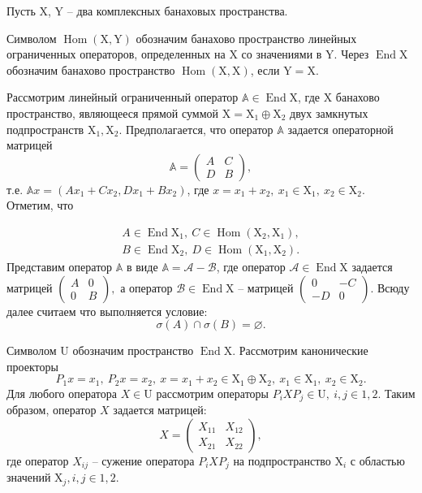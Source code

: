Пусть $\mathrm{X}$, $\mathrm{Y}$ -- два комплексных банаховых пространства.

Символом $\operatorname{Hom}(\mathrm{X}, \mathrm{Y})$ обозначим банахово пространство линейных ограниченных операторов, определенных на $\mathrm{X}$ со значениями в $\mathrm{Y}$. Через $\operatorname{End}\mathrm{X}$ обозначим банахово пространство $\operatorname{Hom}(\mathrm{X}, \mathrm{X})$, 
если $\mathrm{Y} = \mathrm{X}$.

Рассмотрим линейный ограниченный оператор $\mathbb{A} \in \operatorname{End}\mathrm{X}$,
где $\mathrm{X}$ банахово пространство, являющееся прямой суммой 
$\mathrm{X} = \mathrm{X}_1 \oplus \mathrm{X}_2$ двух замкнутых подпространств
$\mathrm{X}_1, \mathrm{X}_2$. Предполагается, что оператор $\mathbb{A}$ задается операторной матрицей
$$
\mathbb{A} = \begin{pmatrix}
		A & C \\
		D & B
	\end{pmatrix},
$$
т.е. $\mathbb{A}x = (A x_1 + C x_2, D x_1 + B x_2)$, где $x = x_1 + x_2, \ x_1 \in \mathrm{X}_1, \ x_2 \in \mathrm{X}_2$. Отметим, что

\begin{align*}
A \in \operatorname{End}\mathrm{X}_1, \ C \in \operatorname{Hom}(\mathrm{X}_2, \mathrm{X}_1), \\
B \in \operatorname{End}\mathrm{X}_2, \ D \in \operatorname{Hom}(\mathrm{X}_1, \mathrm{X}_2).
\end{align*}
Представим оператор $\mathbb{A}$ в виде $\mathbb{A} = \mathcal{A} - \mathcal{B}$, где оператор 
$\mathcal{A} \in \operatorname{End}\mathrm{X}$ задается матрицей 
$\begin{pmatrix}
		A & 0 \\
		0 & B
\end{pmatrix}, $ а оператор $\mathcal{B} \in \operatorname{End}\mathrm{X}$ -- матрицей
$\begin{pmatrix}
		0 & -C \\
		-D & 0
\end{pmatrix}.$
Всюду далее считаем что выполняется условие:
$$
\sigma(A) \cap \sigma(B) = {\varnothing}.
$$

Символом $\mathrm{U}$ обозначим пространство $\operatorname{End}\mathrm{X}$. Рассмотрим канонические проекторы
$$
P_1x = x_1, \ P_2x = x_2, \ x = x_1 + x_2 \in \mathrm{X}_1 \oplus \mathrm{X}_2, 
\ x_1 \in \mathrm{X}_1, \ x_2 \in \mathrm{X}_2.
$$
Для любого оператора $X \in \mathrm{U}$ рассмотрим операторы $P_i X P_j \in \mathrm{U}, \ i,j \in {1,2}.$ Таким образом, оператор $X$ задается матрицей:
$$
X = \begin{pmatrix}
		X_{11} & X_{12} \\
		X_{21} & X_{22}
	\end{pmatrix},
$$
где оператор $X_{ij}$ -- сужение оператора $P_iXP_j$ на подпространство $\mathrm{X}_i$ с областью значений $\mathrm{X}_j, i,j \in {1,2}.$

